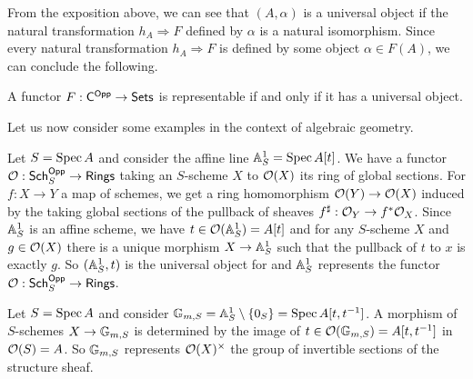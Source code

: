 From the exposition above, we can see that $(A,\alpha)$ is a universal object if the natural transformation $h_{A}\Longrightarrow F$ defined by $\alpha$ is a natural isomorphism. Since every natural transformation $h_{A}\Longrightarrow F$ is defined by some object $\alpha\in F(A)$, we can conclude the following. 
\begin{proposition}\label{prop: representable iff universal object}
    A functor $F:\mathsf{C}^{\mathsf{Opp}}\to\mathsf{Sets}$ is representable if and only if it has a universal object. 
\end{proposition}
Let us now consider some examples in the context of algebraic geometry. 
\begin{example}
    Let $S=\operatorname{Spec} A$ and consider the affine line $\mathbb{A}^{1}_{S}=\operatorname{Spec} A[t]$. We have a functor $\mathcal{O}:\mathsf{Sch}_{S}^{\mathsf{Opp}}\to\mathsf{Rings}$ taking an $S$-scheme $X$ to $\mathcal{O}(X)$ its ring of global sections. For $f:X\to Y$ a map of schemes, we get a ring homomorphism $\mathcal{O}(Y)\to\mathcal{O}(X)$ induced by the taking global sections of the pullback of sheaves $f^{\sharp}:\mathcal{O}_{Y}\to f^{*}\mathcal{O}_{X}$. Since $\mathbb{A}^{1}_{S}$ is an affine scheme, we have $t\in\mathcal{O}(\mathbb{A}^{1}_{S})=A[t]$ and for any $S$-scheme $X$ and $g\in\mathcal{O}(X)$ there is a unique morphism $X\to\mathbb{A}^{1}_{S}$ such that the pullback of $t$ to $x$ is exactly $g$. So $(\mathbb{A}^{1}_{S},t)$ is the universal object for and $\mathbb{A}^{1}_{S}$ represents the functor $\mathcal{O}:\mathsf{Sch}_{S}^{\mathsf{Opp}}\to\mathsf{Rings}$. 
\end{example}
\begin{example}
    Let $S=\operatorname{Spec} A$ and consider $\mathbb{G}_{m,S}=\mathbb{A}^{1}_{S}\setminus\{0_{S}\}=\operatorname{Spec} A[t,t^{-1}]$. A morphism of $S$-schemes $X\to\mathbb{G}_{m,S}$ is determined by the image of $t\in\mathcal{O}(\mathbb{G}_{m,S})=A[t,t^{-1}]$ in $\mathcal{O}(S)=A$. So $\mathbb{G}_{m,S}$ represents $\mathcal{O}(X)^{\times}$ the group of invertible sections of the structure sheaf. 
\end{example}